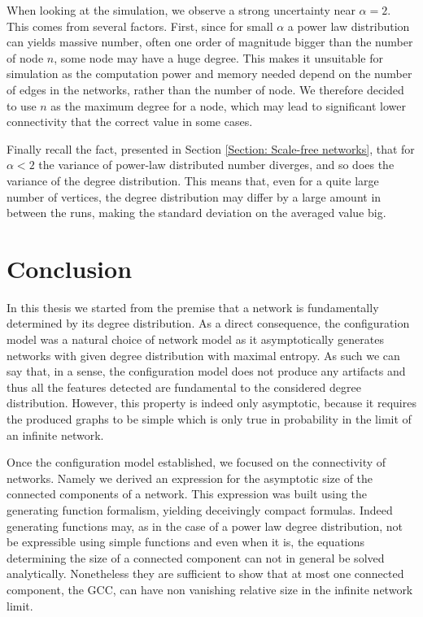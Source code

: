 \documentclass[
11pt, %
american, %
singlespacing, %
final, %
nolistspacing, %
liststotoc, %
headsepline, %
]{MastersDoctoralThesis} %
\begin{document}
When looking at the simulation, we observe a strong uncertainty near $\alpha = 2$. This comes from several factors. First, since for small $\alpha$ a power law distribution can yields massive number, often one order of magnitude bigger than the number of node $n$, some node may have a huge degree. This makes it unsuitable for simulation as the computation power and memory needed depend on the number of edges in the networks, rather than the number of node. We therefore decided to use $n$ as the maximum degree for a node, which may lead to significant lower connectivity that the correct value in some cases.

Finally recall the fact, presented in Section \ref{Section: Scale-free networks}, that for $\alpha < 2$ the variance of power-law distributed number diverges, and so does the variance of the degree distribution. This means that, even for a quite large number of vertices, the degree distribution may differ by a large amount in between the runs, making the standard deviation on the averaged value big.

\chapter{Conclusion}

In this thesis we started from the premise that a network is fundamentally determined by its degree distribution. As a direct consequence, the configuration model was a natural choice of network model as it asymptotically generates networks with given degree distribution with maximal entropy. As such we can say that, in a sense, the configuration model does not produce any artifacts and thus all the features detected are fundamental to the considered degree distribution. However, this property is indeed only asymptotic, because it requires the produced graphs to be simple which is only true in probability in the limit of an infinite network.

Once the configuration model established, we focused on the connectivity of networks. Namely we derived an expression for the asymptotic size of the connected components of a network. This expression was built using the generating function formalism, yielding deceivingly compact formulas. Indeed generating functions may, as in the case of a power law degree distribution, not be expressible using simple functions and even when it is, the equations determining the size of a connected component can not in general be solved analytically. Nonetheless they are sufficient to show that at most one connected component, the GCC, can have non vanishing relative size in the infinite network limit.
\end{document}
